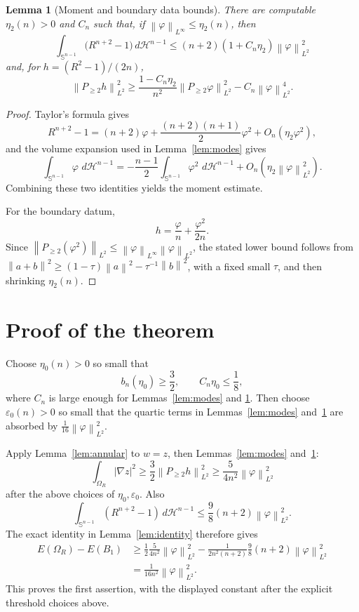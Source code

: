 \documentclass[11pt]{article}
\newtheorem{lemma}[theorem]{Lemma}
\newcommand{\Sph}{\mathbb S^{n-1}}
\newcommand{\Om}{\Omega}
\newcommand{\eps}{\varepsilon}
\newcommand{\dH}{\,d\mathcal H^{n-1}}
\newcommand{\norm}[1]{\left\|#1\right\|}
\begin{document}
\begin{lemma}[Moment and boundary data bounds]\label{lem:taylor}
There are computable \(\eta_2(n)>0\) and \(C_n\) such that, if
\(\norm{\varphi}_{L^\infty}\le\eta_2(n)\), then
\[
   \int_{\Sph}\bigl(R^{n+2}-1\bigr)\dH
      \le (n+2)(1+C_n\eta_2)\norm{\varphi}_{L^2}^2
\]
and, for \(h=(R^2-1)/(2n)\),
\[
   \norm{P_{\ge2}h}_{L^2}^2
      \ge \frac{1-C_n\eta_2}{n^2}
            \norm{P_{\ge2}\varphi}_{L^2}^2
         - C_n\norm{\varphi}_{L^2}^4 .
\]
\end{lemma}

\begin{proof}
Taylor's formula gives
\[
   R^{n+2}-1=(n+2)\varphi+\frac{(n+2)(n+1)}2\varphi^2
      +O_n(\eta_2\varphi^2),
\]
and the volume expansion used in Lemma~\ref{lem:modes} gives
\[
   \int_{\Sph}\varphi\,\dH
      =-\frac{n-1}{2}\int_{\Sph}\varphi^2\,\dH
        +O_n(\eta_2\norm{\varphi}_{L^2}^2).
\]
Combining these two identities yields the moment estimate.

For the boundary datum,
\[
   h=\frac{\varphi}{n}+\frac{\varphi^2}{2n}.
\]
Since
\(\norm{P_{\ge2}(\varphi^2)}_{L^2}\le
\norm{\varphi}_{L^\infty}\norm{\varphi}_{L^2}\),
the stated lower bound follows from
\(\norm{a+b}^2\ge (1-\tau)\norm{a}^2-\tau^{-1}\norm{b}^2\), with a fixed
small \(\tau\), and then shrinking \(\eta_2(n)\).
\end{proof}

\section{Proof of the theorem}

Choose \(\eta_0(n)>0\) so small that
\[
   b_n(\eta_0)\ge\frac32,\qquad C_n\eta_0\le\frac1{8},
\]
where \(C_n\) is large enough for Lemmas~\ref{lem:modes} and
\ref{lem:taylor}.  Then choose \(\eps_0(n)>0\) so small that the
quartic terms in Lemmas~\ref{lem:modes} and~\ref{lem:taylor} are
absorbed by \(\frac1{16}\norm{\varphi}_{L^2}^2\).

Apply Lemma~\ref{lem:annular} to \(w=z\), then Lemmas~\ref{lem:modes}
and~\ref{lem:taylor}:
\[
   \int_{\Om_R}|\nabla z|^2
      \ge \frac{3}{2}\norm{P_{\ge2}h}_{L^2}^2
      \ge \frac{5}{4n^2}\norm{\varphi}_{L^2}^2
\]
after the above choices of \(\eta_0,\eps_0\).  Also
\[
   \int_{\Sph}(R^{n+2}-1)\dH
      \le \frac{9}{8}(n+2)\norm{\varphi}_{L^2}^2 .
\]
The exact identity in Lemma~\ref{lem:identity} therefore gives
\[
\begin{aligned}
   E(\Om_R)-E(B_1)
   &\ge
      \frac12\frac{5}{4n^2}\norm{\varphi}_{L^2}^2
      -\frac{1}{2n^2(n+2)}
       \frac{9}{8}(n+2)\norm{\varphi}_{L^2}^2  \\
   &= \frac{1}{16n^2}\norm{\varphi}_{L^2}^2 .
\end{aligned}
\]
This proves the first assertion, with the displayed constant after the
explicit threshold choices above.
\end{document}
